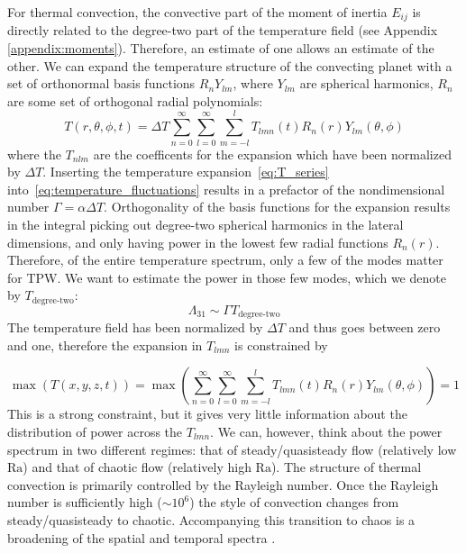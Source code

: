\documentclass[extra,mreferee]{gji}
\begin{document}
For thermal convection, the convective part of the moment of inertia $E_{ij}$ is directly related to the degree-two part of the temperature field (see Appendix \ref{appendix:moments}).
Therefore, an estimate of one allows an estimate of the other.
We can expand the temperature structure of the convecting planet with a set of orthonormal basis functions $R_n Y_{lm}$, 
where $Y_{lm}$ are spherical harmonics, $R_n$ are some set of orthogonal radial polynomials:
\begin{equation} 
T( r , \theta, \phi, t )  = \Delta T {\displaystyle \sum_{n=0}^\infty \sum_{l=0}^\infty \sum_{m=-l}^{l} } T_{lmn}(t) R_n(r) Y_{lm} (\theta , \phi)
\label{eq:T_series}
\end{equation}
where the $T_{nlm}$ are the coefficents for the expansion which have been normalized by $\Delta T$.
Inserting the temperature expansion~\eqref{eq:T_series} into~\eqref{eq:temperature_fluctuations} results in 
a prefactor of the nondimensional number $\Gamma = \alpha \Delta T$.
Orthogonality of the basis functions for the expansion results in the integral picking out degree-two 
spherical harmonics in the lateral dimensions, and only having power in the lowest few radial functions $R_n(r)$.
Therefore, of the entire temperature spectrum, only a few of the modes matter for TPW.
We want to estimate the power in those few modes, which we denote by $T_{\text{degree-two}}$: 
\begin{equation}
\Lambda_{31} \sim \Gamma T_{\text{degree-two}}
\end{equation}
The temperature field has been normalized by $\Delta T$ and thus goes between zero and one, therefore the expansion in $T_{lmn}$ is constrained by

\begin{equation}
\max \left( T(x,y,z, t) \right) = \max \left( \displaystyle \sum_{n=0}^\infty \sum_{l=0}^\infty \sum_{m=-l}^{l} T_{lmn}(t) R_n(r) Y_{lm} (\theta , \phi) \right) = 1
\end{equation}
This is a strong constraint, but it gives very little information about the distribution of power across the $T_{lmn}$.  
We can, however, think about the power spectrum in two different regimes: that of steady/quasisteady flow (relatively low $\mathrm{Ra}$) and that of chaotic flow (relatively high $\mathrm{Ra}$).
The structure of thermal convection is primarily controlled by the Rayleigh number.  Once the Rayleigh number is sufficiently high ($\sim10^6$) 
the style of convection changes from steady/quasisteady to chaotic.  Accompanying this transition to chaos is a broadening of the spatial 
and temporal spectra \citep{mclaughlin1982transition}.  
\end{document}
